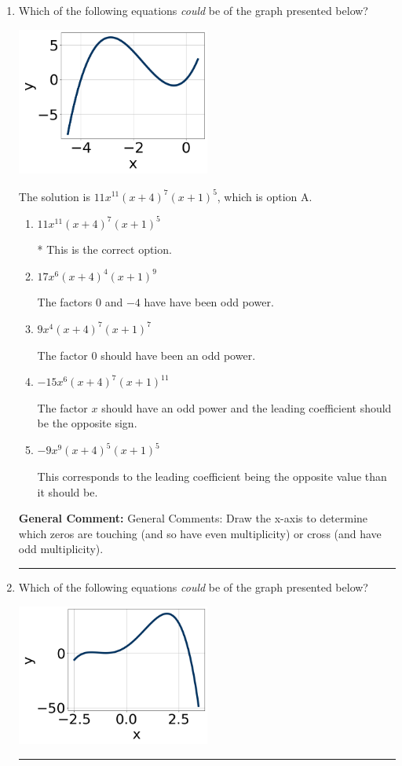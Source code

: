 \documentclass{extbook}[14pt]
\newcommand{\litem}[1]{\item #1

\rule{\textwidth}{0.4pt}}
\begin{document}
\begin{enumerate}\litem{
Which of the following equations \textit{could} be of the graph presented below?

\begin{center}
    \includegraphics[width=0.5\textwidth]{../Figures/polyGraphToFunctionCopyC.png}
\end{center}



The solution is \( 11x^{11} (x + 4)^{7} (x + 1)^{5} \), which is option A.\begin{enumerate}[label=\Alph*.]
\item \( 11x^{11} (x + 4)^{7} (x + 1)^{5} \)

* This is the correct option.
\item \( 17x^{6} (x + 4)^{4} (x + 1)^{9} \)

The factors $0$ and $-4$ have have been odd power.
\item \( 9x^{4} (x + 4)^{7} (x + 1)^{7} \)

The factor $0$ should have been an odd power.
\item \( -15x^{6} (x + 4)^{7} (x + 1)^{11} \)

The factor $x$ should have an odd power and the leading coefficient should be the opposite sign.
\item \( -9x^{9} (x + 4)^{5} (x + 1)^{5} \)

This corresponds to the leading coefficient being the opposite value than it should be.
\end{enumerate}

\textbf{General Comment:} General Comments: Draw the x-axis to determine which zeros are touching (and so have even multiplicity) or cross (and have odd multiplicity).
}
\litem{
Which of the following equations \textit{could} be of the graph presented below?

\begin{center}
    \includegraphics[width=0.5\textwidth]{../Figures/polyGraphToFunctionC.png}
\end{center}



}
\end{enumerate}
\end{document}
